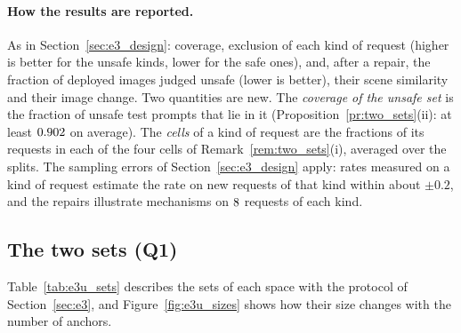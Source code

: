\documentclass{article}
\theoremstyle{plain}
\theoremstyle{remark}
\begin{document}
\paragraph{How the results are reported.}
As in Section~\ref{sec:e3_design}: coverage, exclusion of each kind of request (higher is better for the unsafe kinds, lower for the safe
ones), and, after a repair, the fraction of deployed images judged unsafe (lower is better), their scene similarity and their image
change. Two quantities are new. The \emph{coverage of the unsafe set} is the fraction of unsafe test prompts that lie in it
(Proposition~\ref{pr:two_sets}(ii): at least $0.902$ on average). The \emph{cells} of a kind of request are the fractions of its
requests in each of the four cells of Remark~\ref{rem:two_sets}(i), averaged over the splits. The sampling errors of Section~\ref{sec:e3_design}
apply: rates measured on a kind of request estimate the rate on new requests of that kind within about $\pm0.2$, and the repairs illustrate
mechanisms on $8$ requests of each kind.
\FloatBarrier

\subsection{The two sets (Q1)}\label{sec:e3u_sets}

Table~\ref{tab:e3u_sets} describes the sets of each space with the protocol of Section~\ref{sec:e3}, and Figure~\ref{fig:e3u_sizes}
shows how their size changes with the number of anchors.
\end{document}
